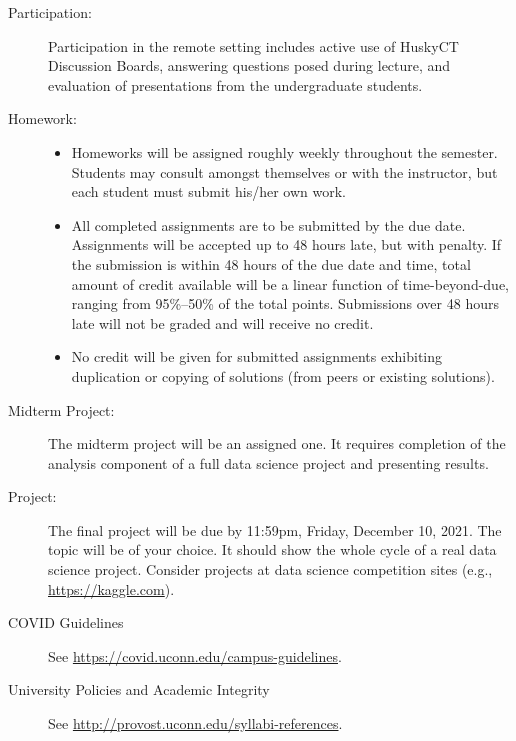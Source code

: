 \documentclass[twocolumn]{article}
\begin{document}
\begin{description}
\item[Participation:]  Participation in the remote setting includes
  active use of HuskyCT Discussion Boards, answering questions posed
  during lecture, and evaluation of presentations from the
  undergraduate students.

\item[Homework:]\hspace{0pt}
\begin{itemize}
\item Homeworks will be assigned roughly weekly throughout the
  semester.  Students may consult amongst themselves or with the
  instructor, but each student must submit his/her own work.
  
\item All completed assignments are to be submitted by the due date. 
Assignments will be accepted up to 48 hours late, but with penalty.  If the
submission is within 48 hours of the due date and time, total amount of credit
available will be a linear function of time-beyond-due, ranging from 95\%--50\%
of the total points. Submissions over 48 hours late will not be graded and will
receive no credit.
		
\item No credit will be given for submitted assignments exhibiting
  duplication or copying of solutions (from peers or existing
  solutions).
\end{itemize}

\item[Midterm Project:]
  The midterm project will be an assigned one. It requires completion
  of the analysis component of a full data science project
  and presenting results.
  
\item[Project:] The final project will be due by 11:59pm, Friday,
  December 10, 2021. The topic will be of your choice. It should show
  the whole cycle of a real data science project. Consider projects at
  data science competition sites (e.g., \url{https://kaggle.com}).


\item[COVID Guidelines]
  See \url{https://covid.uconn.edu/campus-guidelines}.

\item[University Policies and Academic Integrity]
  See \url{http://provost.uconn.edu/syllabi-references}.
  
\end{description}
\end{document}
